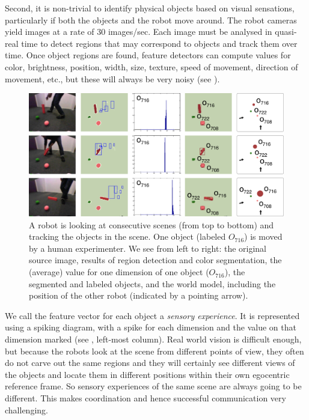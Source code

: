Second, it is non-trivial to identify physical objects based on visual sensations,
particularly if both the objects and the robot move around. The robot
cameras yield images at a rate of 30 images/sec. Each image must be
analysed in quasi-real time to detect regions that may correspond to objects
and track them over time. Once object regions are found, feature detectors can compute values for color,
brightness, position, width, size, texture, speed of movement,
direction of movement, etc., but these will always be very noisy (see ). 
\begin{figure}[htbp]
  \centerline{\includegraphics[width=.85\textwidth]{chap10/figs/png-perception}}
\caption{\label{fig:png-perception} 
A robot is looking at consecutive scenes (from top to bottom) and tracking the objects in the scene. One object (labeled $O_{716}$)
is moved by a human experimenter.  We see from left to right: the original source image, results of region detection and 
color segmentation, the (average) value for one dimension of one object ($O_{716}$), the segmented and labeled objects, 
and the world model, including the position of the other robot (indicated by a pointing arrow). }
\end{figure}

We call the feature vector for each object a {\itshape sensory experience}. 
It is represented using a spiking 
diagram, with a spike for each dimension and the value on that dimension marked (see 
, left-most column). Real
world vision is difficult enough, but because the robots look at the
scene from different points of view, they often do not carve out the
same regions and they will certainly see different views of the
objects and locate them in different positions within their own
egocentric reference frame. So sensory experiences of the same scene
are always going to be different. This makes coordination and hence successful
communication very challenging. 

